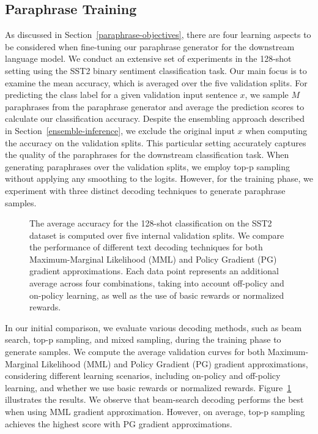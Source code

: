 \documentclass[11pt]{article}
\begin{document}
\subsection{Paraphrase Training}
\label{final-lmfps-result}
As discussed in Section~\ref{paraphrase-objectives}, there are four learning aspects to be considered when fine-tuning our paraphrase generator for the downstream language model. We conduct an extensive set of experiments in the 128-shot setting using the SST2 binary sentiment classification task. Our main focus is to examine the mean accuracy, which is averaged over the five validation splits. For predicting the class label for a given validation input sentence $x$, we sample $M$ paraphrases from the paraphrase generator and average the prediction scores to calculate our classification accuracy. Despite the ensembling approach described in Section~\ref{ensemble-inference}, we exclude the original input $x$ when computing the accuracy on the validation splits. This particular setting accurately captures the quality of the paraphrases for the downstream classification task. When generating paraphrases over the validation splits, we employ top-p sampling without applying any smoothing to the logits. However, for the training phase, we experiment with three distinct decoding techniques to generate paraphrase samples.

\begin{figure}[h]

\begin{center}

\end{center}
\caption{The average accuracy for the 128-shot classification on the SST2 dataset is computed over five internal validation splits. We compare the performance of different text decoding techniques for both Maximum-Marginal Likelihood (MML) and Policy Gradient (PG) gradient approximations. Each data point represents an additional average across four combinations, taking into account off-policy and on-policy learning, as well as the use of basic rewards or normalized rewards.}
\label{decoding_methods}
\end{figure}

In our initial comparison, we evaluate various decoding methods, such as beam search, top-p sampling, and mixed sampling, during the training phase to generate samples. We compute the average validation curves for both Maximum-Marginal Likelihood (MML) and Policy Gradient (PG) gradient approximations, considering different learning scenarios, including on-policy and off-policy learning, and whether we use basic rewards or normalized rewards. Figure~\ref{decoding_methods} illustrates the results. We observe that beam-search decoding performs the best when using MML gradient approximation. However, on average, top-p sampling achieves the highest score with PG gradient approximations.
\end{document}
